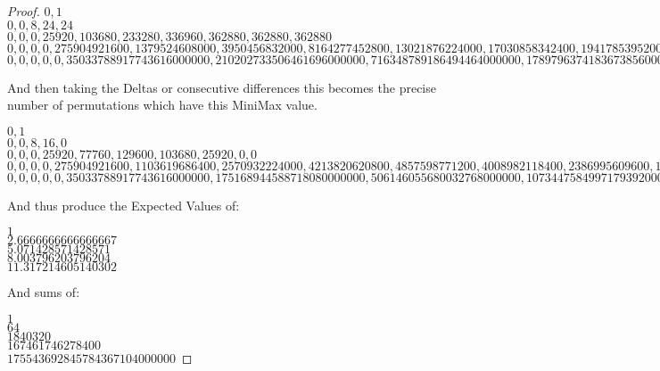 \documentclass[12pt]{article}
\begin{document}
\begin{proof}
	$0,1$ \\
	$0,0,8,24,24$ \\
	$0,0,0,25920,103680,233280,336960,362880,362880,362880$ \\
	$0,0,0,0,275904921600,1379524608000,3950456832000,8164277452800,13021876224000,17030858342400,19417853952000,20462948352000,20830821580800,20922789888000,20922789888000,20922789888000,20922789888000$ \\
	$0,0,0,0,0,35033788917743616000000,210202733506461696000000,716348789186494464000000,1789796374183673856000000,3579466207334105088000000,5968813997021331456000000,8571636509788864512000000,10933280851841187840000000,12756041165184565248000000,13981455492460904448000000,14720075503498100736000000,15131397132053250048000000,15346284896671432704000000,15449900912724934656000000,15493693148872114176000000,15508290560921174016000000,15511210043330985984000000,15511210043330985984000000,15511210043330985984000000,15511210043330985984000000,15511210043330985984000000$

	And then taking the Deltas or consecutive differences this becomes the precise number of permutations which have this MiniMax value.

	$0,1$ \\
	$0,0,8,16,0$ \\
	$0, 0, 0, 25920, 77760, 129600, 103680, 25920, 0, 0$ \\
	$0, 0, 0, 0, 275904921600, 1103619686400, 2570932224000, 4213820620800, 4857598771200, 4008982118400, 2386995609600, 1045094400000, 367873228800, 91968307200, 0, 0, 0$ \\
	$0, 0, 0, 0, 0, 35033788917743616000000, 175168944588718080000000, 506146055680032768000000, 1073447584997179392000000, 1789669833150431232000000, 2389347789687226368000000, 2602822512767533056000000, 2361644342052323328000000, 1822760313343377408000000, 1225414327276339200000000, 738620011037196288000000, 411321628555149312000000, 214887764618182656000000, 103616016053501952000000, 43792236147179520000000, 14597412049059840000000, 2919482409811968000000, 0, 0, 0, 0$

	And thus produce the Expected Values of:

	$1$ \\
	$2.6666666666666667$ \\
	$5.071428571428571$ \\
	$8.003796203796204$ \\
	$11.317214605140302$

	And sums of:

	$1$ \\
	$64$ \\
	$1840320$ \\
	$167461746278400$ \\
	$175543692845784367104000000$
\end{proof}
\end{document}

